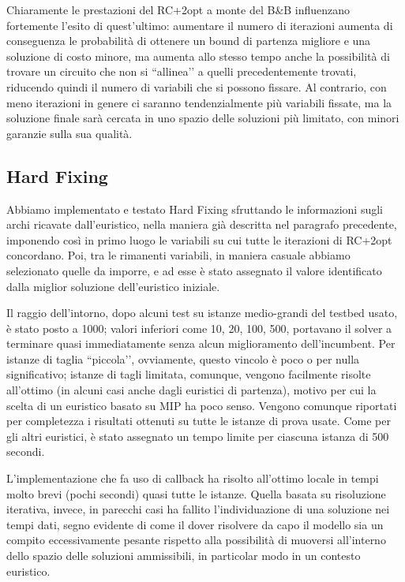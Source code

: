 Chiaramente le prestazioni del RC+2opt a monte del B\&B influenzano fortemente l’esito di quest’ultimo: aumentare il numero di iterazioni aumenta di conseguenza le probabilità di ottenere un bound di partenza migliore e una soluzione di costo minore, ma aumenta allo stesso tempo anche la possibilità di trovare un circuito che non si ``allinea’’ a quelli precedentemente trovati, riducendo quindi il numero di variabili che si possono fissare. Al contrario, con meno iterazioni in genere ci saranno tendenzialmente più variabili fissate, ma la soluzione finale sarà cercata in uno spazio delle soluzioni più limitato, con minori garanzie sulla sua qualità.

\subsection{Hard Fixing}
Abbiamo implementato e testato Hard Fixing sfruttando le informazioni sugli archi ricavate dall’euristico, nella maniera già descritta nel paragrafo precedente, imponendo così in primo luogo le variabili su cui tutte le iterazioni di RC+2opt concordano. Poi, tra le rimanenti variabili, in maniera casuale abbiamo selezionato quelle da imporre, e ad esse è stato assegnato il valore identificato dalla miglior soluzione dell’euristico iniziale.

Il raggio dell’intorno, dopo alcuni test su istanze medio-grandi del testbed usato, è stato posto a 1000; valori inferiori come 10, 20, 100, 500, portavano il solver a terminare quasi immediatamente senza alcun miglioramento dell’incumbent. Per istanze di taglia ``piccola’’, ovviamente, questo vincolo è poco o per nulla significativo; istanze di tagli limitata, comunque, vengono facilmente risolte all’ottimo (in alcuni casi anche dagli euristici di partenza), motivo per cui la scelta di un euristico basato su MIP ha poco senso. Vengono comunque riportati per completezza i risultati ottenuti su tutte le istanze di prova usate. Come per gli altri euristici, è stato assegnato un tempo limite per ciascuna istanza di 500 secondi.

L’implementazione che fa uso di callback ha risolto all’ottimo locale in tempi molto brevi (pochi secondi) quasi tutte le istanze. Quella basata su risoluzione iterativa, invece, in parecchi casi ha fallito l’individuazione di una soluzione nei tempi dati, segno evidente di come il dover risolvere da capo il modello sia un compito eccessivamente pesante rispetto alla possibilità di muoversi all’interno dello spazio delle soluzioni ammissibili, in particolar modo in un contesto euristico.

